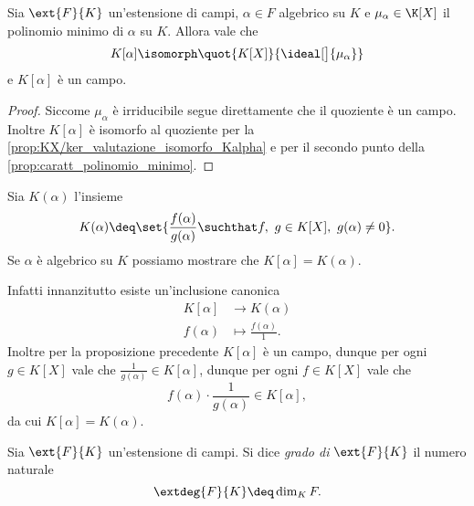 \begin{proposition}
    Sia $\ext{F}{K}$ un'estensione di campi, $\alpha \in F$ algebrico su $K$ e $\mu_\alpha \in \K[X]$ il polinomio minimo di $\alpha$ su $K$. Allora vale che \[
        K[\alpha] \isomorph \quot{K[X]}{\ideal[\big]{\mu_\alpha}}
    \] e $K[\alpha]$ è un campo.
\end{proposition}
\begin{proof}
    Siccome $\mu_\alpha$ è irriducibile segue direttamente che il quoziente è un campo. Inoltre $K[\alpha]$ è isomorfo al quoziente per la \autoref{prop:KX/ker_valutazione_isomorfo_Kalpha} e per il secondo punto della \autoref{prop:caratt_polinomio_minimo}.
\end{proof}

\begin{remark}
    Sia $K(\alpha)$ l'insieme \[
        K(\alpha) \deq \set{\frac{f(\alpha)}{g(\alpha)} \suchthat f,\ g \in K[X],\ g(\alpha) \neq 0}.    
    \] Se $\alpha$ è algebrico su $K$ possiamo mostrare che $K[\alpha] = K(\alpha)$.

    Infatti innanzitutto esiste un'inclusione canonica \begin{align*}
        K[\alpha] &\to K(\alpha)\\
        f(\alpha) &\mapsto \frac{f(\alpha)}{1}.
    \end{align*} Inoltre per la proposizione precedente $K[\alpha]$ è un campo, dunque per ogni $g \in K[X]$ vale che $\frac{1}{g(\alpha)} \in K[\alpha]$, dunque per ogni $f \in K[X]$ vale che \[
        f(\alpha) \cdot \frac{1}{g(\alpha)} \in K[\alpha],    
    \] da cui $K[\alpha] = K(\alpha)$.
\end{remark}

\begin{definition}
    Sia $\ext{F}{K}$ un'estensione di campi. Si dice \emph{grado di} $\ext{F}{K}$ il numero naturale \[
        \extdeg{F}{K} \deq \dim_K F.    
    \]
\end{definition}

